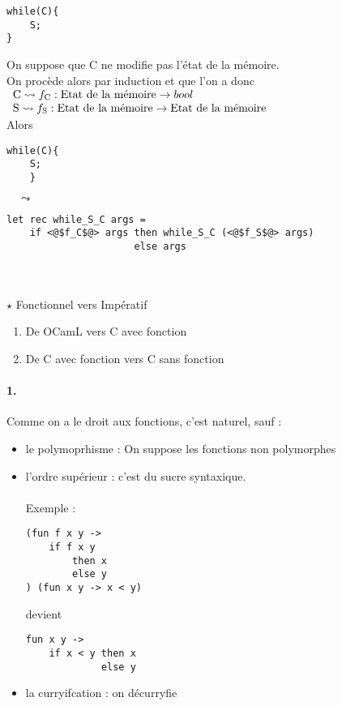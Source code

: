 \begin{minipage}{0.12\linewidth}
\begin{lstlisting}[style=CStyle]
while(C){
	S;
}
\end{lstlisting}
\end{minipage} \quad
On suppose que C ne modifie pas l'état de la mémoire.
\\
On procède alors par induction et que l'on a donc $ \begin{array}{l}
\text{C} \leadsto f_{\text C} : \text{Etat de la mémoire} \to bool\\
\text{S} \leadsto f_{\text S} : \text{Etat de la mémoire} \to \text{Etat de la mémoire}
\end{array}$
\\
Alors \begin{minipage}{0.12\linewidth}
	\begin{lstlisting}[style=CStyle]
	while(C){
	S;
	}
	\end{lstlisting}
\end{minipage} $\quad \leadsto \quad$ \begin{minipage}{0.7 \linewidth}
\begin{lstlisting}
let rec while_S_C args =
    if <@$f_C$@> args then while_S_C (<@$f_S$@> args)
                      else args
\end{lstlisting}
\end{minipage}\\\\

$\star$ Fonctionnel vers Impératif
\begin{enumerate}
	\item De OCamL vers C avec fonction
	\item De C avec fonction vers C sans fonction
\end{enumerate}

\paragraph{1.} Comme on a le droit aux fonctions, c'est naturel, sauf :
\begin{itemize}[label = $\bullet$]
	\item le polymoprhisme : On suppose les fonctions non polymorphes
	\item l'ordre supérieur : c'est du sucre syntaxique.\\\\
	Exemple : \enspace
	\begin{minipage}{0.35\linewidth}
		\begin{lstlisting}
(fun f x y -> 
	if f x y 
	    then x 
	    else y
) (fun x y -> x < y)
		\end{lstlisting}
	\end{minipage}\enspace devient \enspace \begin{minipage}{0.3\linewidth}
	\begin{lstlisting}
fun x y -> 
    if x < y then x 
             else y
	\end{lstlisting}
\end{minipage}
	\item la curryifcation : on décurryfie
\end{itemize}

